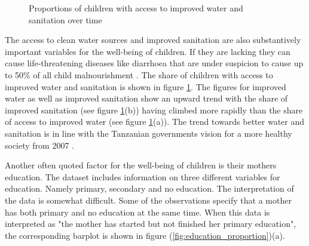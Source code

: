 \documentclass[a4paper, 11pt]{article} %
\begin{document}
\begin{figure}[!h]
    \centering
    \qquad
    \caption{Proportions of children with access to improved water and sanitation over time}%
    \label{fig:water_sanitation_proportion}%
\end{figure}

The access to clean water sources and improved sanitation are also substantively important variables for the well-being of children. If they are lacking they can cause life-threatening diseases like diarrhoea that are under suspicion to cause up to 50\% of all child malnourishment \cite{UNI18}. The share of children with access to improved water and sanitation is shown in figure \ref{fig:water_sanitation_proportion}. The figures for improved water as well as improved sanitation show an upward trend with the share of improved sanitation (see figure \ref{fig:water_sanitation_proportion}(b)) having climbed more rapidly than the share of access to improved water (see figure \ref{fig:water_sanitation_proportion}(a)). The trend towards better water and sanitation is in line with the Tanzanian governments vision for a more healthy society from 2007 \cite{Health2016Dec}.


Another often quoted factor for the well-being of children is their mothers education. The dataset includes information on three different variables for education. Namely primary, secondary and no education. The interpretation of the data is somewhat difficult. Some of the observations specify that a mother has both primary and no education at the same time. When this data is interpreted as "the mother has started but not finished her primary education", the corresponding barplot is shown in figure (\ref{fig:education_proportion})(a). 
\end{document}
